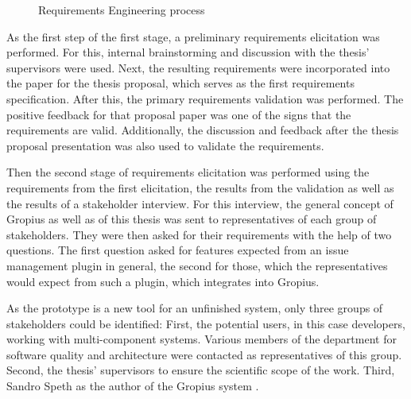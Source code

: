 \begin{figure}[!h]
	\caption{Requirements Engineering process}
	\label{fig:requirmentsProcess}
\end{figure}

As the first step of the first stage, a preliminary requirements elicitation was performed. 
For this, internal brainstorming and discussion with the thesis' supervisors were used.
Next, the resulting requirements were incorporated into the paper for the thesis proposal, 
which serves as the first requirements specification.
After this, the primary requirements validation was performed. 
The positive feedback for that proposal paper was one of the signs that the requirements are valid.
Additionally, the discussion and feedback after the thesis proposal presentation was also used to validate the requirements.

Then the second stage of requirements elicitation was performed using the requirements from the first elicitation, 
the results from the validation as well as the results of a stakeholder interview.
For this interview, the general concept of Gropius as well as of this thesis was sent to representatives of each group of stakeholders. 
They were then asked for their requirements with the help of two questions.
The first question asked for features expected from an issue management plugin in general,
the second for those, which the representatives would expect from such a plugin, which integrates into Gropius.

As the prototype is a new tool for an unfinished system, only three groups of stakeholders could be identified:
First, the potential users, in this case developers, working with multi-component systems.
Various members of the department for software quality and architecture were contacted as representatives of this group.
Second, the thesis' supervisors to ensure the scientific scope of the work. 
Third, Sandro Speth as the author of the Gropius system \cite{speth2020gropius}.

